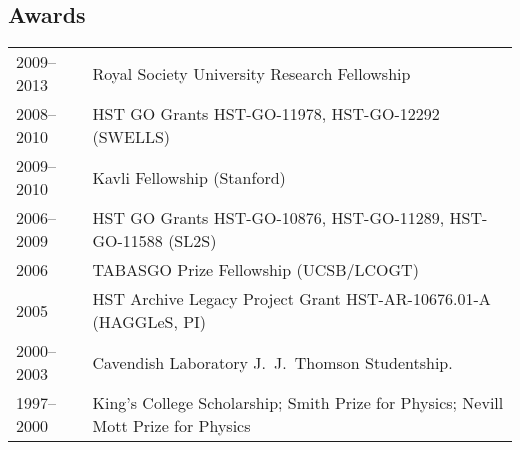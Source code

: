 \subsection*{Awards}

\begin{tabular}{@{}p{2.5cm}p{15.5cm}}
2009--2013  & Royal Society University Research Fellowship \\
2008--2010  & HST GO Grants HST-GO-11978, HST-GO-12292 (SWELLS)\\
2009--2010  & Kavli Fellowship (Stanford) \\
2006--2009  & HST GO Grants HST-GO-10876, HST-GO-11289, HST-GO-11588 (SL2S)\\
2006        & TABASGO Prize Fellowship (UCSB/LCOGT) \\
2005        & HST Archive Legacy Project Grant HST-AR-10676.01-A (HAGGLeS, PI)\\
2000--2003  & Cavendish Laboratory J.\ J.\ Thomson Studentship.\\
1997--2000  & King's College Scholarship; Smith Prize for Physics; Nevill Mott Prize for Physics
\end{tabular}
